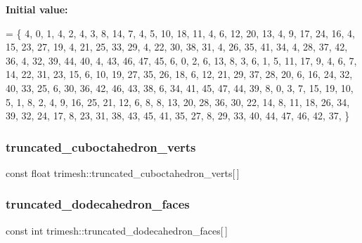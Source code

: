 {\bfseries Initial value\+:}
\begin{DoxyCode}
= \{
    4, 0, 1, 4, 2,
    4, 3, 8, 14, 7,
    4, 5, 10, 18, 11,
    4, 6, 12, 20, 13,
    4, 9, 17, 24, 16,
    4, 15, 23, 27, 19,
    4, 21, 25, 33, 29,
    4, 22, 30, 38, 31,
    4, 26, 35, 41, 34,
    4, 28, 37, 42, 36,
    4, 32, 39, 44, 40,
    4, 43, 46, 47, 45,
    6, 0, 2, 6, 13, 8, 3,
    6, 1, 5, 11, 17, 9, 4,
    6, 7, 14, 22, 31, 23, 15,
    6, 10, 19, 27, 35, 26, 18,
    6, 12, 21, 29, 37, 28, 20,
    6, 16, 24, 32, 40, 33, 25,
    6, 30, 36, 42, 46, 43, 38,
    6, 34, 41, 45, 47, 44, 39,
    8, 0, 3, 7, 15, 19, 10, 5, 1,
    8, 2, 4, 9, 16, 25, 21, 12, 6,
    8, 8, 13, 20, 28, 36, 30, 22, 14,
    8, 11, 18, 26, 34, 39, 32, 24, 17,
    8, 23, 31, 38, 43, 45, 41, 35, 27,
    8, 29, 33, 40, 44, 47, 46, 42, 37,
\}
\end{DoxyCode}
\mbox{\label{namespacetrimesh_a63ef8ec13e1ae40c6280d1b2a8b494ae}} 
\subsubsection{\texorpdfstring{truncated\+\_\+cuboctahedron\+\_\+verts}{truncated\_cuboctahedron\_verts}}
{\footnotesize\ttfamily const float trimesh\+::truncated\+\_\+cuboctahedron\+\_\+verts\mbox{[}$\,$\mbox{]}\hspace{0.3cm}{\ttfamily [static]}}

\mbox{\label{namespacetrimesh_a483ac5f8a9620be17f403a0c28d41201}} 
\subsubsection{\texorpdfstring{truncated\+\_\+dodecahedron\+\_\+faces}{truncated\_dodecahedron\_faces}}
{\footnotesize\ttfamily const int trimesh\+::truncated\+\_\+dodecahedron\+\_\+faces\mbox{[}$\,$\mbox{]}\hspace{0.3cm}{\ttfamily [static]}}

\mbox{\label{namespacetrimesh_a86aa0c70c1ce84f8e9427de9d7b03cf1}} 
